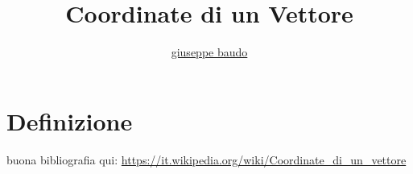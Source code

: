 \documentclass[a4paper,10pt]{article}
\title{Coordinate di un Vettore}
\author{\href{http://www.baudo.hol.es}{giuseppe baudo}}
\begin{document}
\maketitle

\section{Definizione}
buona bibliografia qui: \url{https://it.wikipedia.org/wiki/Coordinate_di_un_vettore}
\end{document}
